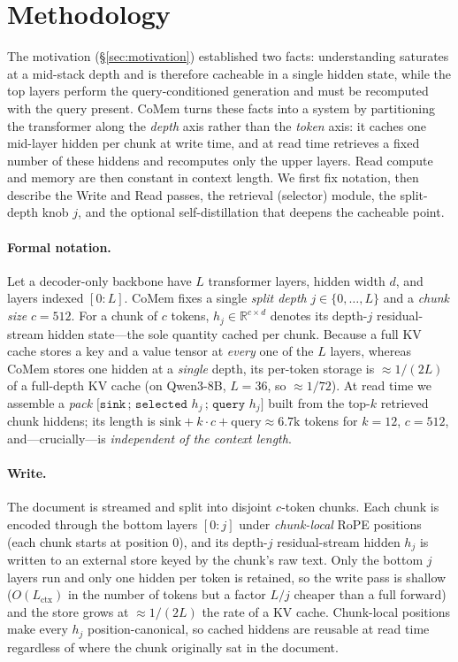 \section{Methodology}
\label{sec:method}
The motivation (\S\ref{sec:motivation}) established two facts: understanding
saturates at a mid-stack depth and is therefore cacheable in a single hidden
state, while the top layers perform the query-conditioned generation and must
be recomputed with the query present. CoMem turns these facts into a system by
partitioning the transformer along the \emph{depth} axis rather than the
\emph{token} axis: it caches one mid-layer hidden per chunk at write time, and
at read time retrieves a fixed number of these hiddens and recomputes only the
upper layers. Read compute and memory are then constant in context length. We
first fix notation, then describe the Write and Read passes, the retrieval
(selector) module, the split-depth knob $j$, and the optional self-distillation
that deepens the cacheable point.

\paragraph{Formal notation.} Let a decoder-only backbone have $L$ transformer
layers, hidden width $d$, and layers indexed $[0{:}L]$. CoMem fixes a single
\emph{split depth} $j\in\{0,\dots,L\}$ and a \emph{chunk size} $c{=}512$. For a
chunk of $c$ tokens, $h_j\in\mathbb{R}^{c\times d}$ denotes its depth-$j$
residual-stream hidden state---the sole quantity cached per chunk. Because a
full KV cache stores a key and a value tensor at \emph{every} one of the $L$
layers, whereas CoMem stores one hidden at a \emph{single} depth, its per-token
storage is $\approx 1/(2L)$ of a full-depth KV cache (on Qwen3-8B, $L{=}36$, so
$\approx 1/72$). At read time we assemble a \emph{pack}
$\texttt{[sink}\,;\,\texttt{selected }h_j\,;\,\texttt{query }h_j\texttt{]}$
built from the top-$k$ retrieved chunk hiddens; its length is
$\text{sink}+k\!\cdot\!c+\text{query}\approx 6.7\text{k}$ tokens for $k{=}12$,
$c{=}512$, and---crucially---is \emph{independent of the context length}.

\paragraph{Write.} The document is streamed and split into disjoint
$c$-token chunks. Each chunk is encoded through the bottom layers $[0{:}j]$
under \emph{chunk-local} RoPE positions (each chunk starts at position $0$), and
its depth-$j$ residual-stream hidden $h_j$ is written to an external store keyed
by the chunk's raw text. Only the bottom $j$ layers run and only one hidden per
token is retained, so the write pass is shallow ($O(L_{\text{ctx}})$ in the
number of tokens but a factor $L/j$ cheaper than a full forward) and the store
grows at $\approx 1/(2L)$ the rate of a KV cache. Chunk-local positions make
every $h_j$ position-canonical, so cached hiddens are reusable at read time
regardless of where the chunk originally sat in the document.

